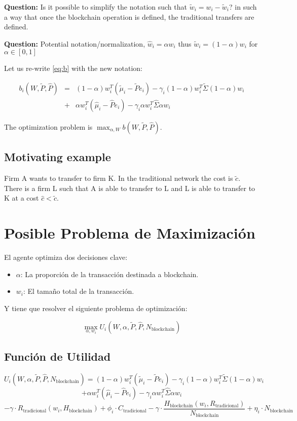 {\bf Question:} Is it possible to simplify the notation such that $\tilde w_i=w_i-\tilde w_i$? in such a way that once the blockchain operation is defined, the traditional transfers are defined.

{\bf Question:} Potential notation/normalization, $\hat w_i=\alpha w_i$ thus $\tilde w_i=(1-\alpha) w_i$ for $\alpha\in[0,1]$

Let us re-write \ref{eq:b} with the new notation:

\begin{eqnarray}
    b_i(W,\tilde P,\hat P)&=&(1-\alpha) w_i^T(\tilde \mu_i-\tilde Pe_i)-\gamma_i(1-\alpha) w_i^T\tilde \Sigma (1-\alpha) w_i\nonumber\\
            &+&\alpha w_i^T(\hat \mu_i-\hat Pe_i)-\gamma_i\alpha w_i^T\hat \Sigma \alpha w_i\label{eq:b}
\end{eqnarray}

The optimization problem is $\max_{\alpha, W}b(W,\tilde P, \hat P)$.


\subsection{Motivating example}

Firm A wants to transfer to firm K. In the traditional network the cost is $\tilde c$. There is a firm L such that A is able to transfer to L and L is able to transfer to K at a cost $\hat c<\tilde c$.
\section{Posible Problema de Maximización}

El agente optimiza dos decisiones clave:
\begin{itemize}
    \item $\alpha$: La proporción de la transacción destinada a blockchain.
    \item $w_i$: El tamaño total de la transacción.
\end{itemize}

Y tiene que resolver el siguiente problema de optimización:

\[
\max_{\alpha, w_i} U_i(W, \alpha, \tilde{P}, \hat{P}, N_{\text{blockchain}})
\]

\subsection{Función de Utilidad}

\[
U_i(W, \alpha, \tilde{P}, \hat{P}, N_{\text{blockchain}}) = (1 - \alpha) w_i^T (\tilde{\mu}_i - \tilde{P}e_i) - \gamma_i (1 - \alpha) w_i^T \tilde{\Sigma} (1 - \alpha) w_i
\]
\[
+ \alpha w_i^T (\hat{\mu}_i - \hat{P}e_i) - \gamma_i \alpha w_i^T \hat{\Sigma} \alpha w_i
\]
\[
- \gamma \cdot R_{\text{tradicional}}(w_i, H_{\text{blockchain}}) + \phi_i \cdot C_{\text{tradicional}} 
- \gamma \cdot \frac{H_{\text{blockchain}}(w_i, R_{\text{tradicional}})}{N_{\text{blockchain}}} + \eta_i \cdot N_{\text{blockchain}}
\]

